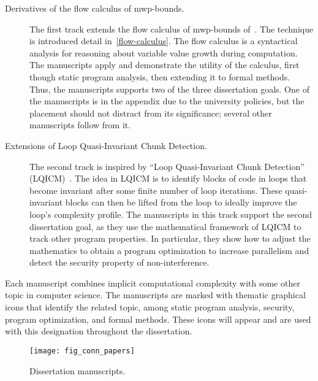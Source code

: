 \begin{description}
\item[Derivatives of the flow calculus of mwp-bounds.]
The first track extends the flow calculus of mwp-bounds of~\textcite{jones2009}.
The technique is introduced detail in~\autoref{flow-calculus}.
The flow calculus is a syntactical analysis for reasoning about variable value growth during computation.
The manuscripts apply and demonstrate the utility of the calculus, first though static program analysis, then extending it to formal methods.
Thus, the manuscripts supports two of the three dissertation goals.
One of the manuscripts is in the appendix due to the university policies, but the placement should not distract from its significance;
several other manuscripts follow from it.

\item[Extensions of Loop Quasi-Invariant Chunk Detection.]
The second track is inspired by \enquote{Loop Quasi-Invariant Chunk Detection} (LQICM)~\cite{moyen20172}.
The idea in LQICM is to identify blocks of code in loops that become invariant after some finite number of loop iterations.
These quasi-invariant blocks can then be lifted from the loop to ideally improve the loop's complexity profile.
The manuscripts in this track support the second dissertation goal,
as they use the mathematical framework of LQICM to track other program properties.
In particular, they show how to adjust the mathematics to obtain a program optimization to increase parallelism and detect the security property of non-interference.
\end{description}

Each manuscript combines implicit computational complexity with some other topic in computer science.
The manuscripts are marked with thematic graphical icons that identify the related topic, among static program analysis, security, program optimization, and formal methods.
These icons will appear and are used with this designation throughout the dissertation.

\begin{figure}[p]
\texttt{[image: fig\_conn\_papers]}
\caption[Dissertation manuscripts]{Dissertation manuscripts.}
\label{fig:conn_papers}
\end{figure}

